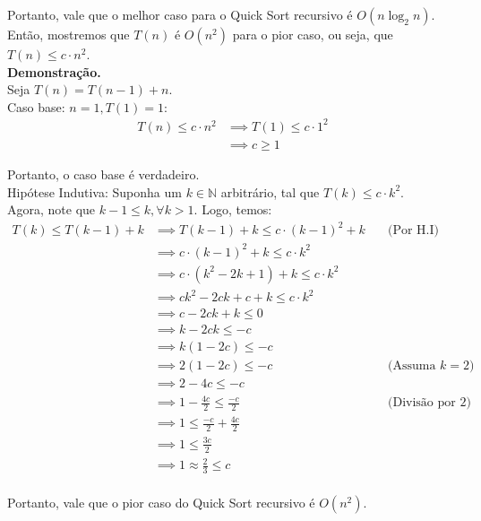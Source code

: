 Portanto, vale que o melhor caso para o Quick Sort recursivo é $O(n \log_2 n)$. \\
Então, mostremos que $T(n)$ é $O(n^2)$ para o pior caso, ou seja, que $T(n) \le c \cdot n^2$. \\
\textbf{Demonstração.} \\
Seja $T(n) = T(n - 1) + n$. \\
Caso base: $n = 1, T(1) = 1$:
\begin{align*}
  T(n) \le c \cdot n^2 & \implies T(1) \le c \cdot 1^2 \\
  & \implies c \ge 1 
\end{align*}

Portanto, o caso base é verdadeiro. \\
Hipótese Indutiva: Suponha um $k \in \mathbb{N}$ arbitrário, tal que $T(k) \le c \cdot k^2$. \\
Agora, note que $k - 1 \le k, \forall k > 1$. Logo, temos:
\begin{align*}
  T(k) \le T(k - 1) + k & \implies T(k - 1) + k \le c \cdot (k-1)^2 + k & \quad \text{(Por H.I)} \\
  & \implies c \cdot (k-1)^2 + k \le c \cdot k^2  \\
  & \implies c \cdot (k^2 - 2k + 1) + k \le c \cdot k^2  \\
  & \implies ck^2 - 2ck + c + k \le c \cdot k^2  \\
  & \implies c - 2ck + k \le 0  \\
  & \implies k - 2ck \le -c  \\
  & \implies k(1 - 2c) \le -c  \\
  & \implies 2(1 - 2c) \le -c &\quad \text{(Assuma $k = 2$)} \\
  & \implies 2 - 4c\le -c \\
  & \implies 1 - \frac{4c}{2} \le \frac{-c}{2} &\quad \text{(Divisão por 2)} \\
  & \implies 1 \le \frac{-c}{2} + \frac{4c}{2}\\
  & \implies 1 \le \frac{3c}{2} \\
  & \implies 1 \approx \frac{2}{3} \le c \\
\end{align*}

Portanto, vale que o pior caso do Quick Sort recursivo é $O(n^2)$.
